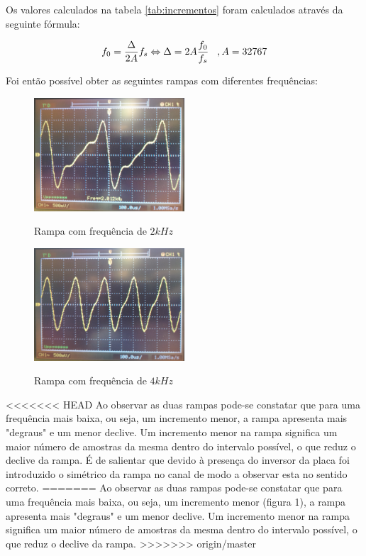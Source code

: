 \documentclass[11pt]{article}
\begin{document}
Os valores calculados na tabela \ref{tab:incrementos} foram calculados através da seguinte fórmula:

\begin{equation}
 f_{0}= \frac{\Delta}{2A}f_{s} \Leftrightarrow \Delta= 2A\frac{f_{0}}{f_{s}} \hspace{3 mm}, A=32767
\end{equation}

Foi então possível obter as seguintes rampas com diferentes frequências:


\begin{figure}[H]
	\centering
	\includegraphics[width=0.5\textwidth]{./P1_2kHz}~\\
	\caption{Rampa com frequência de $ 2 kHz $}
\end{figure}


\begin{figure}[H]
	\centering
	\includegraphics[width=0.5\textwidth]{./P1_4kHz}~\\
	\caption{Rampa com frequência de $ 4 kHz $}
\end{figure}
<<<<<<< HEAD
Ao observar as duas rampas pode-se constatar que para uma frequência mais baixa, ou seja, um incremento menor, a rampa apresenta mais "degraus" e um menor declive. Um incremento menor na rampa significa um maior número de amostras da mesma dentro do intervalo possível, o que reduz o declive da rampa. É de salientar que devido à presença do inversor da placa foi introduzido o simétrico da rampa no canal de modo a observar esta no sentido correto.
=======
Ao observar as duas rampas pode-se constatar que para uma frequência mais baixa, ou seja, um incremento menor (figura 1), a rampa apresenta mais "degraus" e um menor declive. Um incremento menor na rampa significa um maior número de amostras da mesma dentro do intervalo possível, o que reduz o declive da rampa.
>>>>>>> origin/master
\vspace{2 mm}
\end{document}
